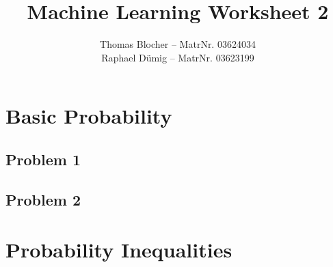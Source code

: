 \documentclass{scrartcl}
\title{Machine Learning Worksheet 2}
\author{Thomas Blocher -- MatrNr. 03624034 \\ Raphael D\"umig -- MatrNr. 03623199}
\begin{document}
\maketitle

\section{Basic Probability}
\subsection*{Problem 1}


\subsection*{Problem 2}


\section{Probability Inequalities}




\end{document}
